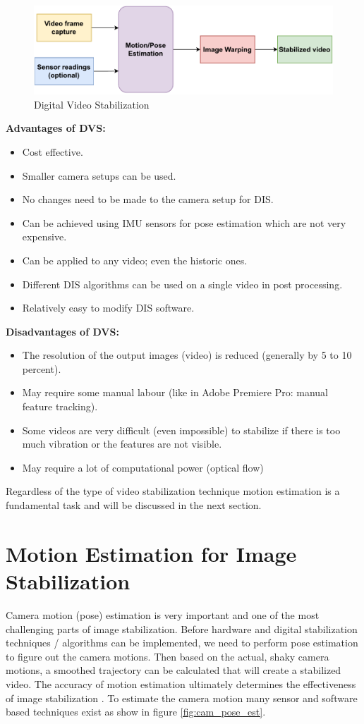 \begin{figure}[H]
\centering
\includegraphics[scale=0.75]{images/fig_chapter2/2_1_dis.pdf}
\caption{Digital Video Stabilization}
\label{fig:dis}
\end{figure}

\textbf{Advantages of DVS: }
\begin{itemize}
\item Cost effective.
\item Smaller camera setups can be used.
\item No changes need to be made to the camera setup for DIS.
\item Can be achieved using IMU sensors for pose estimation which are not very expensive.
\item Can be applied to any video; even the historic ones.
\item Different DIS algorithms can be used on a single video in post processing.
\item Relatively easy to modify DIS software.
\end{itemize}

\textbf{Disadvantages of DVS:}
\begin{itemize}
\item The resolution of the output images (video) is reduced (generally by 5 to 10 percent).
\item May require some manual labour (like in Adobe Premiere Pro: manual feature tracking).
\item Some videos are very difficult (even impossible) to stabilize if there is too much vibration or the features are not visible.
\item May require a lot of computational power (optical flow)
\end{itemize}

Regardless of the type of video stabilization technique motion estimation is a fundamental task and will be discussed in the next section.

\section{Motion Estimation for Image Stabilization}
\label{sec:pose_estimation}
Camera motion (pose) estimation is very important and one of the most challenging parts of image stabilization. Before hardware and digital stabilization techniques / algorithms can be implemented, we need to perform pose estimation to figure out the camera motions. Then based on the actual, shaky camera motions, a smoothed trajectory can be calculated that will create a stabilized video. The accuracy of motion estimation ultimately determines the effectiveness of image stabilization \citep{ryu2012robust}. To estimate the camera motion many sensor and software based techniques exist as show in figure \ref{fig:cam_pose_est}.

